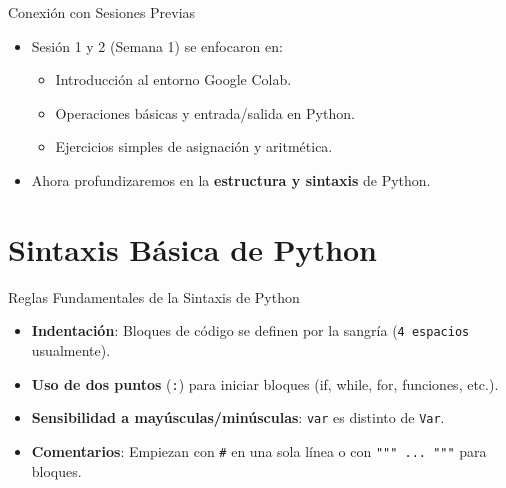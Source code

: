 \documentclass[10pt]{beamer}
\begin{document}
\begin{frame}{Conexión con Sesiones Previas}
  \begin{itemize}
    \item Sesión 1 y 2 (Semana 1) se enfocaron en:
      \begin{itemize}
        \item Introducción al entorno Google Colab.
        \item Operaciones básicas y entrada/salida en Python.
        \item Ejercicios simples de asignación y aritmética.
      \end{itemize}
    \item Ahora profundizaremos en la \textbf{estructura y sintaxis} de Python.
  \end{itemize}
\end{frame}

\section{Sintaxis Básica de Python}

\begin{frame}{Reglas Fundamentales de la Sintaxis de Python}
  \begin{itemize}
    \item \textbf{Indentación}: Bloques de código se definen por la sangría (\texttt{4 espacios} usualmente).
    \item \textbf{Uso de dos puntos} (\texttt{:}) para iniciar bloques (if, while, for, funciones, etc.).
    \item \textbf{Sensibilidad a mayúsculas/minúsculas}: \texttt{var} es distinto de \texttt{Var}.
    \item \textbf{Comentarios}: Empiezan con \texttt{\#} en una sola línea o con \texttt{""" ... """} para bloques.
  \end{itemize}
\end{frame}
\end{document}
